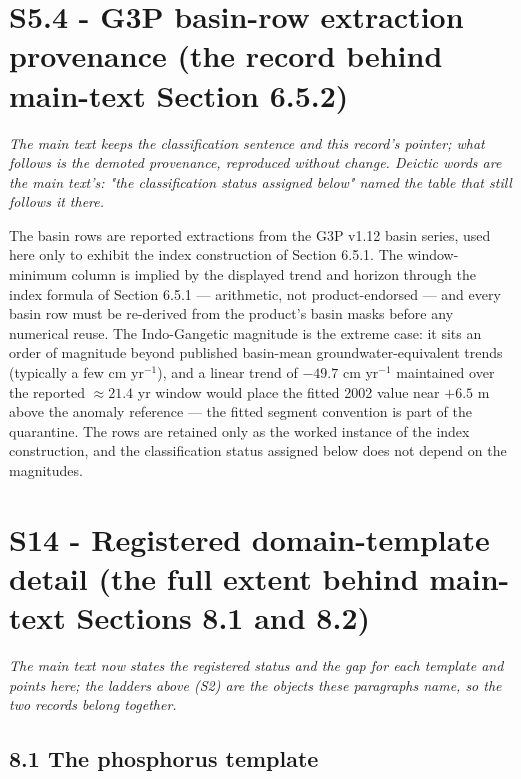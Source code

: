 \documentclass[11pt]{article}
\begin{document}
\section*{S5.4 - G3P basin-row extraction provenance (the record behind main-text Section 6.5.2)}\label{s54---g3p-basin-row-extraction-provenance-the-record-behind-main-text-}

\emph{The main text keeps the classification sentence and this record's pointer; what follows is the demoted provenance, reproduced without change. Deictic words are the main text's: "the classification status assigned below" named the table that still follows it there.}

The basin rows are reported extractions from the G3P v1.12 basin series, used here only to exhibit the index construction of Section 6.5.1. The window-minimum column is implied by the displayed trend and horizon through the index formula of Section 6.5.1 --- arithmetic, not product-endorsed --- and every basin row must be re-derived from the product's basin masks before any numerical reuse. The Indo-Gangetic magnitude is the extreme case: it sits an order of magnitude beyond published basin-mean groundwater-equivalent trends (typically a few cm yr\(^{-1}\)), and a linear trend of \(-49.7\) cm yr\(^{-1}\) maintained over the reported \(\approx 21.4\) yr window would place the fitted 2002 value near \(+6.5\) m above the anomaly reference --- the fitted segment convention is part of the quarantine. The rows are retained only as the worked instance of the index construction, and the classification status assigned below does not depend on the magnitudes.

\section*{S14 - Registered domain-template detail (the full extent behind main-text Sections 8.1 and 8.2)}\label{s14---registered-domain-template-detail-the-full-extent-behind-main-te}

\emph{The main text now states the registered status and the gap for each template and points here; the ladders above (S2) are the objects these paragraphs name, so the two records belong together.}

\subsection*{8.1 The phosphorus template}\label{81-the-phosphorus-template}
\end{document}
